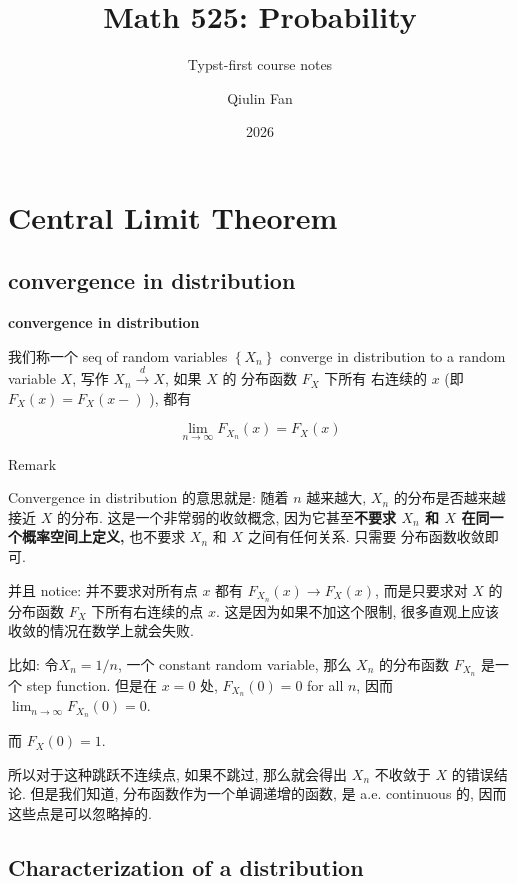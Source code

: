 \documentclass{qlnotes-export}
\title{Math 525: Probability}
\subtitle{Typst-first course notes}
\author{Qiulin Fan}
\date{2026}
\begin{document}
\mainmatter
\chapter{Central Limit Theorem}\label{central-limit-theorem}

\section{convergence in distribution}\label{convergence-in-distribution}

\begin{definition}{\protect{}\label{kn-convergence-in-distribution}{\textbf{convergence
in distribution}}}

我们称一个 seq of random variables \(\left\{ X_{n} \right\}\) converge in distribution to a random variable \(X\), 写作 \(X_{n}\overset{d}{\rightarrow}X\), 如果 \(X\) 的 分布函数 \(F_{X}\) 下所有 右连续的 \(x\) (即 \(F_{X}(x) = F_{X}(x - )\) ), 都有

\[\lim\limits_{n\rightarrow\infty}F_{X_{n}}(x) = F_{X}(x)\]

\end{definition}

\begin{qlremark}{Remark}

Convergence in distribution 的意思就是: 随着 \(n\) 越来越大, \(X_{n}\) 的分布是否越来越接近 \(X\) 的分布. 这是一个非常弱的收敛概念, 因为它甚至\textbf{不要求 \(X_{n}\) 和 \(X\) 在同一个概率空间上定义,} 也不要求 \(X_{n}\) 和 \(X\) 之间有任何关系. 只需要 分布函数收敛即可.

并且 notice: 并不要求对所有点 \(x\) 都有 \(F_{X_{n}}(x)\rightarrow F_{X}(x)\), 而是只要求对 \(X\) 的分布函数 \(F_{X}\) 下所有右连续的点 \(x\). 这是因为如果不加这个限制, 很多直观上应该收敛的情况在数学上就会失败.

比如: 令\(X_{n} = 1/n\), 一个 constant random variable, 那么 \(X_{n}\) 的分布函数 \(F_{X_{n}}\) 是一个 step function. 但是在 \(x = 0\) 处, \(F_{X_{n}}(0) = 0\) for all \(n\), 因而 \(\lim_{n\rightarrow\infty}F_{X_{n}}(0) = 0\).

而 \(F_{X}(0) = 1\).

所以对于这种跳跃不连续点, 如果不跳过, 那么就会得出 \(X_{n}\) 不收敛于 \(X\) 的错误结论. 但是我们知道, 分布函数作为一个单调递增的函数, 是 a.e. continuous 的, 因而这些点是可以忽略掉的.

\end{qlremark}

\section{Characterization of a distribution}\label{characterization-of-a-distribution}
\end{document}
